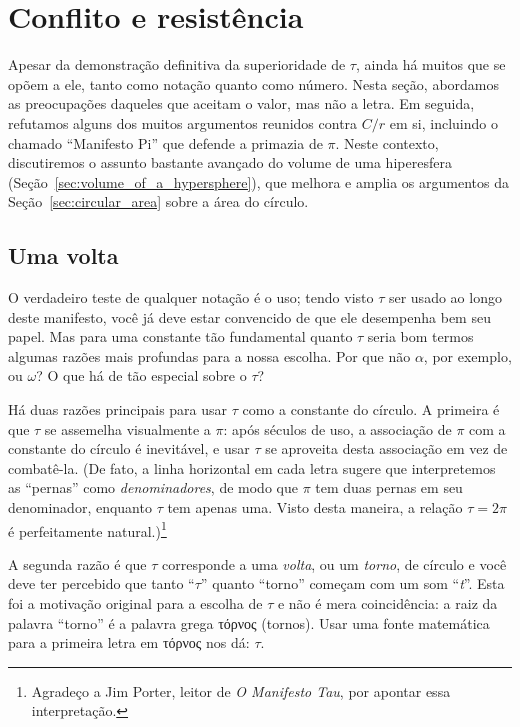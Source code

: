 

\section{Conflito e resistência} %
\label{sec:conflict_and_resistance}

Apesar da demonstração definitiva da superioridade de $\tau$, ainda há muitos que se opõem a ele, tanto como notação quanto como número. Nesta seção, abordamos as preocupações daqueles que aceitam o valor, mas não a letra. Em seguida, refutamos alguns dos muitos argumentos reunidos contra $C/r$ em si, incluindo o chamado ``Manifesto Pi'' que defende a primazia de $\pi$. Neste contexto, discutiremos o assunto bastante avançado do volume de uma hiperesfera (Seção~\ref{sec:volume_of_a_hypersphere}), que melhora e amplia os argumentos da Seção~\ref{sec:circular_area} sobre a área do círculo.

  \subsection{Uma volta} %
  \label{sec:one_turn}

O verdadeiro teste de qualquer notação é o uso; tendo visto $\tau$ ser usado ao longo deste manifesto, você já deve estar convencido de que ele desempenha bem seu papel. Mas para uma constante tão fundamental quanto $\tau$ seria bom termos algumas razões mais profundas para a nossa escolha. Por que não $\alpha$, por exemplo, ou $\omega$? O que há de tão especial sobre o $\tau$?

Há duas razões principais para usar $\tau$ como a constante do círculo. A primeira é que $\tau$ se assemelha visualmente a $\pi$: após séculos de uso, a associação de $\pi$ com a constante do círculo é inevitável, e usar $\tau$ se aproveita desta associação em vez de combatê-la. (De fato, a linha horizontal em cada letra sugere que interpretemos as ``pernas'' como \emph{denominadores}, de modo que $\pi$ tem duas pernas em seu denominador, enquanto $\tau$ tem apenas uma. Visto desta maneira, a relação $\tau = 2\pi$ é perfeitamente natural.)\footnote{Agradeço a Jim Porter, leitor de \emph{O Manifesto Tau}, por apontar essa interpretação.}

A segunda razão é que $\tau$ corresponde a uma \emph{volta}, ou um \emph{torno}, de círculo e você deve ter percebido que tanto ``$\tau$'' quanto ``torno'' começam com um som ``\emph{t}''. Esta foi a motivação original para a escolha de $\tau$ e não é mera coincidência: a raiz da palavra ``torno'' é a palavra grega τόρνος (tornos). Usar uma fonte matemática para a primeira letra em τόρνος nos dá: $\tau$.

